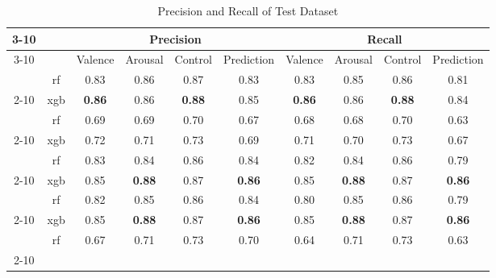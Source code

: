 \begin{table}[t]
\caption{Precision and Recall of Test Dataset} %
\centering
\hspace*{-1.8cm}
\begin{tabular}{cc|c|c|c|c|c|c|c|c|}
\cline{3-10}
 &
   &
  \multicolumn{4}{c|}{Precision} &
  \multicolumn{4}{c|}{Recall} \\ \cline{3-10} 
 &
   &
  Valence &
  Arousal &
  Control &
  Prediction &
  Valence &
  Arousal &
  Control &
  Prediction \\ \hline
\multicolumn{1}{|c|}{} &
  rf &
  0.83 &
  0.86 &
  0.87 &
  0.83 &
  0.83 &
  0.85 &
  0.86 &
  0.81 \\ \cline{2-10} 
\multicolumn{1}{|c|}{\multirow{r}} &
  xgb &
  \cellcolor[HTML]{FFFC9E}\textbf{0.86} &
  0.86 &
  \cellcolor[HTML]{FFFC9E}\textbf{0.88} &
  0.85 &
  \cellcolor[HTML]{FFFC9E}\textbf{0.86} &
  0.86 &
  \cellcolor[HTML]{FFFC9E}\textbf{0.88} &
  0.84 \\ \hline
\multicolumn{1}{|c|}{} &
  rf &
  0.69 &
  0.69 &
  0.70 &
  0.67 &
  0.68 &
  0.68 &
  0.70 &
  0.63 \\ \cline{2-10} 
\multicolumn{1}{|c|}{\multirow{b}} &
  xgb &
  0.72 &
  0.71 &
  0.73 &
  0.69 &
  0.71 &
  0.70 &
  0.73 &
  0.67 \\ \hline
\multicolumn{1}{|c|}{} &
  rf &
  0.83 &
  0.84 &
  0.86 &
  0.84 &
  0.82 &
  0.84 &
  0.86 &
  0.79 \\ \cline{2-10} 
\multicolumn{1}{|c|}{\multirow{s}} &
  xgb &
  0.85 &
  \cellcolor[HTML]{FFFC9E}\textbf{0.88} &
  0.87 &
  \cellcolor[HTML]{FFFC9E}\textbf{0.86} &
  0.85 &
  \cellcolor[HTML]{FFFC9E}\textbf{0.88} &
  0.87 &
  \cellcolor[HTML]{FFFC9E}\textbf{0.86} \\ \hline
\multicolumn{1}{|c|}{} &
  rf &
  0.82 &
  0.85 &
  0.86 &
  0.84 &
  0.80 &
  0.85 &
  0.86 &
  0.79 \\ \cline{2-10} 
\multicolumn{1}{|c|}{\multirow{b\_s}} &
  xgb &
  0.85 &
  \cellcolor[HTML]{FFFC9E}\textbf{0.88} &
  0.87 &
  \cellcolor[HTML]{FFFC9E}\textbf{0.86} &
  0.85 &
  \cellcolor[HTML]{FFFC9E}\textbf{0.88} &
  0.87 &
  \cellcolor[HTML]{FFFC9E}\textbf{0.86} \\ \hline
\multicolumn{1}{|c|}{} &
  rf &
  0.67 &
  0.71 &
  0.73 &
  0.70 &
  0.64 &
  0.71 &
  0.73 &
  0.63 \\ \cline{2-10} 

\end{tabular}
\end{table}
